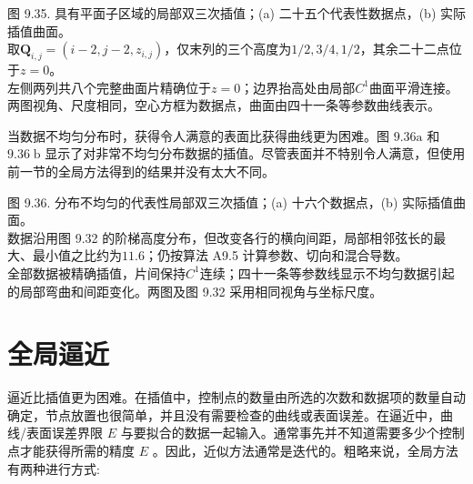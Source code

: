 \documentclass[../main.tex]{subfiles}
\begin{document}
\begin{center}
\begin{minipage}{33cm}
\vspace*{.6\baselineskip}
\centering
{}
\par\smallskip
图 9.35. 具有平面子区域的局部双三次插值；(a) 二十五个代表性数据点，(b) 实际插值曲面。\\
取$\mathbf Q_{i,j}=(i-2,j-2,z_{i,j})$，仅末列的三个高度为$1/2,3/4,1/2$，其余二十二点位于$z=0$。\\
左侧两列共八个完整曲面片精确位于$z=0$；边界抬高处由局部$C^1$曲面平滑连接。两图视角、尺度相同，空心方框为数据点，曲面由四十一条等参数曲线表示。
\end{minipage}
\end{center}

当数据不均匀分布时，获得令人满意的表面比获得曲线更为困难。图 \({9.36}\mathrm{a}\) 和 \({9.36}\mathrm{\;b}\) 显示了对非常不均匀分布数据的插值。尽管表面并不特别令人满意，但使用前一节的全局方法得到的结果并没有太大不同。



\begin{center}
\begin{minipage}{29cm}
\vspace*{.6\baselineskip}
\centering
{}
\par\smallskip
图 9.36. 分布不均匀的代表性局部双三次插值；(a) 十六个数据点，(b) 实际插值曲面。\\
数据沿用图 9.32 的阶梯高度分布，但改变各行的横向间距，局部相邻弦长的最大、最小值之比约为$11.6$；仍按算法 A9.5 计算参数、切向和混合导数。\\
全部数据被精确插值，片间保持$C^1$连续；四十一条等参数线显示不均匀数据引起的局部弯曲和间距变化。两图及图 9.32 采用相同视角与坐标尺度。
\end{minipage}
\end{center}

\section{全局逼近}

逼近比插值更为困难。在插值中，控制点的数量由所选的次数和数据项的数量自动确定，节点放置也很简单，并且没有需要检查的曲线或表面误差。在逼近中，曲线/表面误差界限 \(E\) 与要拟合的数据一起输入。通常事先并不知道需要多少个控制点才能获得所需的精度 \(E\) 。因此，近似方法通常是迭代的。粗略来说，全局方法有两种进行方式:
\end{document}
